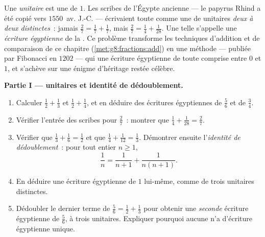 \begin{problem}
\label{pb:g8:fractions:1}
Une \emph{ unitaire} est une  de  $1$. Les
scribes de l'Égypte ancienne --- le papyrus Rhind a été copié vers
$1550$~av. J.-C. --- écrivaient toute  comme une  de
 unitaires \emph{deux à deux distinctes}~: jamais
$\frac27 = \frac17 + \frac17$, mais $\frac27 = \frac14 +
\frac{1}{28}$. Une telle  s'appelle une \emph{écriture
égyptienne} de la . Ce problème transforme les techniques
d'addition et de comparaison de ce chapitre
(\cref{met:g8:fractions:add}) en une méthode --- publiée par
Fibonacci en $1202$ --- qui  une écriture égyptienne de toute
 comprise entre $0$ et $1$, et s'achève sur une énigme
d'héritage restée célèbre.

\medskip
\noindent\textbf{Partie I ---  unitaires et identité de
dédoublement.}
\begin{enumerate}
  \item Calculer $\frac12 + \frac13$ et $\frac12 + \frac14$, et en
        déduire des écritures égyptiennes de $\frac56$ et de
        $\frac34$.
  \item Vérifier l'entrée des scribes pour $\frac27$~: montrer que
        $\frac14 + \frac{1}{28} = \frac27$.
  \item Vérifier que $\frac13 + \frac16 = \frac12$ et que
        $\frac14 + \frac{1}{12} = \frac13$. Démontrer ensuite
        l'\emph{identité de dédoublement}~: pour tout entier
        $n \geq 1$,
        \[
        \frac{1}{n} = \frac{1}{n+1} + \frac{1}{n(n+1)} .
        \]
  \item En déduire une écriture égyptienne de $1$ lui-même, comme
         de trois  unitaires distinctes.
  \item Dédoubler le dernier terme de $\frac56 = \frac12 + \frac13$
        pour obtenir une \emph{seconde} écriture égyptienne de
        $\frac56$, à trois  unitaires. Expliquer pourquoi
        aucune  n'a d'écriture égyptienne unique.
\end{enumerate}


\end{problem}
